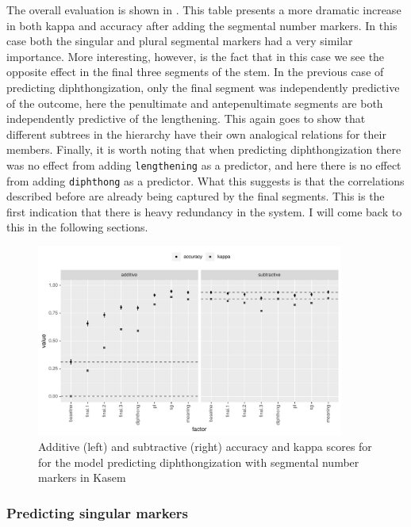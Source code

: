 \clearpage 
The overall evaluation is shown in . This table presents a more dramatic increase in both kappa and accuracy after adding the segmental number markers. In this case both the singular and plural segmental markers had a very similar importance. More interesting, however, is the fact that in this case we see the opposite effect in the final three segments of the stem. In the previous case of predicting diphthongization, only the final segment was independently predictive of the outcome, here the penultimate and antepenultimate segments are both independently predictive of the lengthening. This again goes to show that different subtrees in the hierarchy have their own analogical relations for their members. Finally, it is worth noting that when predicting diphthongization there was no effect from adding \texttt{lengthening} as a predictor, and here there is no effect from adding \texttt{diphthong} as a predictor. What this suggests is that the correlations described before are already being captured by the final segments. This is the first indication that there is heavy redundancy in the system. I will come back to this in the following sections.

\begin{figure}
  \centering
  \includegraphics[width=0.9\textwidth]{./figures/kasem/p-fi-length-sg-overall.pdf}
  \caption{Additive (left) and subtractive (right) accuracy and kappa scores for for the model predicting diphthongization with segmental number markers in Kasem}\label{fig:overall-fi-length}
\end{figure}

\subsubsection{Predicting singular markers}

